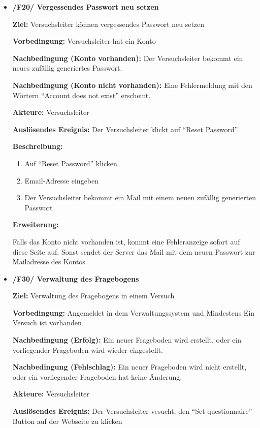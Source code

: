 \documentclass[a4paper]{scrreprt}
\begin{document}
\begin{itemize}
                \item \textbf{/F20/ Vergessendes Passwort neu setzen}

                \par \textbf{Ziel: }\gls{Versuchsleiter} können vergessendes Passwort neu setzen
                \par \textbf{Vorbedingung: }\gls{Versuchsleiter} hat ein Konto
                \par \textbf{Nachbedingung (Konto vorhanden): }Der \gls{Versuchsleiter} bekommt ein neues zufällig generiertes Passwort.
                \par \textbf{Nachbedingung (Konto nicht vorhanden): }Eine Fehlermeldung mit den Wörtern ``Account does not exist'' erscheint.
                \par \textbf{Akteure: }\gls{Versuchsleiter}
                \par \textbf{Auslösendes Ereignis: }Der \gls{Versuchsleiter} klickt auf ``Reset Password''
                \par \textbf{Beschreibung: }
                \begin{enumerate}
                    \item Auf ``Reset Password'' klicken
                    \item Email-Adresse eingeben
                    \item Der \gls{Versuchsleiter} bekommt ein Mail mit einem neuen zufällig generierten Passwort 
                \end{enumerate}
                \par \textbf{Erweiterung: }
                    \par Falls das Konto nicht vorhanden ist, kommt eine Fehleranzeige sofort auf diese Seite auf. Sonst sendet der Server das Mail mit dem neuen Passwort zur Mailadresse des Kontos.


                \item \textbf{/F30/ Verwaltung des Fragebogens}

                \par \textbf{Ziel: }Verwaltung des Fragebogens in einem Versuch
                \par \textbf{Vorbedingung: }Angemeldet in dem Verwaltungssystem und Mindestens Ein Versuch ist vorhanden
                \par \textbf{Nachbedingung (Erfolg): }Ein neuer Frageboden wird erstellt, oder ein vorliegender Frageboden wird wieder eingestellt.
                \par \textbf{Nachbedingung (Fehlschlag): }Ein neuer Frageboden wird nicht erstellt, oder ein vorliegender Frageboden hat keine Änderung.
                \par \textbf{Akteure: }\gls{Versuchsleiter}
                \par \textbf{Auslösendes Ereignis: }Der \gls{Versuchsleiter} vesucht, den ``Set questionnaire'' Button auf der Webseite zu klicken


\end{itemize}
\end{document}
